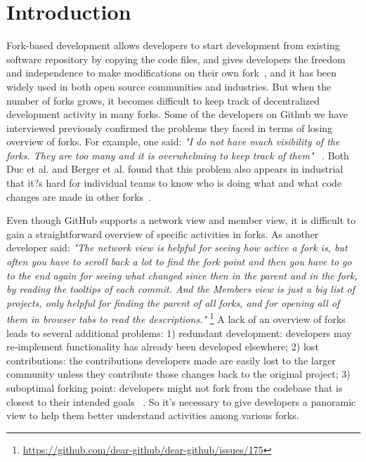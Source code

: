 \section{Introduction}
Fork-based development allows developers to start development from existing software repository by copying the code files, and gives developers the freedom and independence to make modifications on their own fork~\cite{dubinsky2013exploratory, bitzer2006impact, ernst2010code,vetter2007open}, and it has been widely used in both open source communities and industries. But when the number of forks grows, it becomes difficult to keep track of decentralized development activity in many forks. Some of the developers on Github we have interviewed previously confirmed the problems they faced in terms of losing overview of forks. For example, one said: \emph{"I do not have much visibility of the forks. They are too many and it is overwhelming to keep track of them"} ~\cite{ZSLXWK:ICSE18}. Both Duc et al. and Berger et al. found that this problem also appears in industrial that it?s hard for individual teams to know who is doing what and what code changes are made in other forks~\cite{berger2014three,Duc:2014:FCM:2652524.2652546}.

Even though GitHub supports a network view and member view, it is difficult to gain a straightforward overview of specific activities in forks. As another developer said: \emph{"The network view is helpful for seeing how active a fork is, but often you have to scroll back a lot to find the fork point and then you have to go to the end again for seeing what changed since then in the parent and in the fork, by reading the tooltips of each commit. And the Members view is just a big list of projects, only helpful for finding the parent of all forks, and for opening all of them in browser tabs to read the descriptions."} \footnote{\url{https://github.com/dear-github/dear-github/issues/175}}
 A lack of an overview of forks leads to several additional problems: 1) redundant development: developers may re-implement functionality has already been developed elsewhere; 2) lost contributions: the contributions developers made are easily lost to the larger community unless they contribute those changes back to the original project; 3) suboptimal forking point: developers might not fork from the codebase that is closest to their intended goals ~\cite{ZSLXWK:ICSE18, dubinsky2013exploratory,stanciulescu2015forked}. So it's necessary to give developers a panoramic view to help them better understand activities among various forks.

